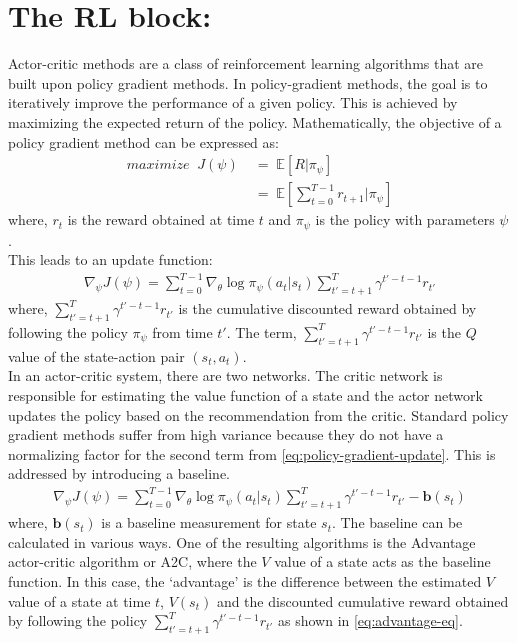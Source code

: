 \section*{The RL block:}

Actor-critic methods are a class of reinforcement learning algorithms that are built upon policy gradient methods. 
In policy-gradient methods, the goal is to iteratively improve the performance of a given policy. This is achieved by maximizing the expected return of the policy. Mathematically, the objective of a policy gradient method can be expressed as:
\begin{align}
maximize \;\; J( \psi )  &\; = \; \mathbb{E} [ R | \pi_{\psi} ] \\
                       & \; = \; \mathbb{E}[ \sum^{T-1}_{t=0} r_{t+1}| \pi_{\psi}] 
\end{align}
where, $r_{t}$ is the reward obtained at time $t$ and $\pi_{\psi}$ is the policy with parameters $\psi$.\\
This leads to an update function:
\begin{align}
\label{eq:policy-gradient-update}
\nabla_{\psi} J (\psi) = \sum_{t=0}^{T-1} \nabla_{\theta}\log \pi_{\psi}(a_{t}|s_{t})\sum_{t'=t+1}^{T} \gamma^{t'-t-1} r_{t'}
\end{align} 
where, $\sum_{t'=t+1}^{T} \gamma^{t'-t-1} r_{t'}$ is the cumulative discounted reward obtained by following the policy $\pi_{\psi}$ from time $t'$. The term,  $\sum_{t'=t+1}^{T} \gamma^{t'-t-1} r_{t'}$ is the $Q$ value of the state-action pair $(s_{t}, a_{t})$.\\
In an actor-critic system, there are two networks. The critic network is responsible for estimating the value function of a state and the actor network updates the policy based on the recommendation from the critic.
Standard policy gradient methods suffer from high variance because they do not have a normalizing factor for the second term from \autoref{eq:policy-gradient-update}. This is addressed by introducing a baseline.
\begin{align}
\label{eq:policy-gradient-update-baseline}
\nabla_{\psi} J (\psi) = \sum_{t=0}^{T-1} \nabla_{\theta}\log \pi_{\psi}(a_{t}|s_{t})\sum_{t'=t+1}^{T} \gamma^{t'-t-1} r_{t'} - \mathbf{b}(s_{t})
\end{align}
where, $\mathbf{b}(s_{t})$ is a baseline measurement for state $s_{t}$.
 The baseline can be calculated in various ways. One of the resulting algorithms is the Advantage actor-critic algorithm or A2C\cite{mnih_actor_critic_2016}, where the $V$ value of a state acts as the baseline function. In this case, the `advantage' is the difference between the estimated $V$ value of a state at time $t$, $V(s_t)$ and the discounted cumulative reward obtained by following the policy $\sum_{t'=t+1}^{T} \gamma^{t'-t-1} r_{t'}$ as shown in \autoref{eq:advantage-eq}.\\

